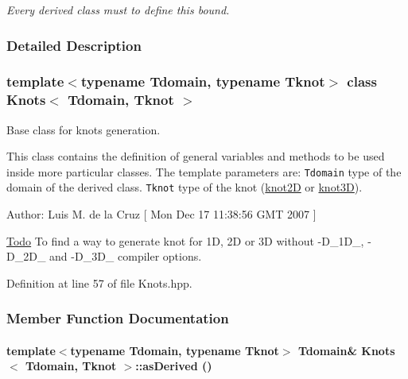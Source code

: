 \begin{CompactItemize}
\begin{CompactList}\small\item\em Every derived class must to define this bound. \item\end{CompactList}\end{CompactItemize}


\subsubsection{Detailed Description}
\subsubsection*{template$<$typename Tdomain, typename Tknot$>$ class Knots$<$ Tdomain, Tknot $>$}

Base class for knots generation. 

This class contains the definition of general variables and methods to be used inside more particular classes. The template parameters are: {\tt Tdomain} type of the domain of the derived class. {\tt Tknot} type of the knot (\hyperlink{structknot2D}{knot2D} or \hyperlink{structknot3D}{knot3D}). \begin{Desc}
\item[Author:]Luis M. de la Cruz \mbox{[} Mon Dec 17 11:38:56 GMT 2007 \mbox{]} \end{Desc}
\begin{Desc}
\item[\hyperlink{todo__todo000002}{Todo}]To find a way to generate knot for 1D, 2D or 3D without -D\_\-1D\_\-, -D\_\-2D\_\- and -D\_\-3D\_\- compiler options.\end{Desc}


Definition at line 57 of file Knots.hpp.

\subsubsection{Member Function Documentation}
\hypertarget{classKnots_e3b3eef036a98b0269f4e6f6c488201b}{
\paragraph[{asDerived}]{\setlength{\rightskip}{0pt plus 5cm}template$<$typename Tdomain, typename Tknot$>$ Tdomain\& {\bf Knots}$<$ Tdomain, Tknot $>$::asDerived ()}\hfill}
\label{classKnots_e3b3eef036a98b0269f4e6f6c488201b}


